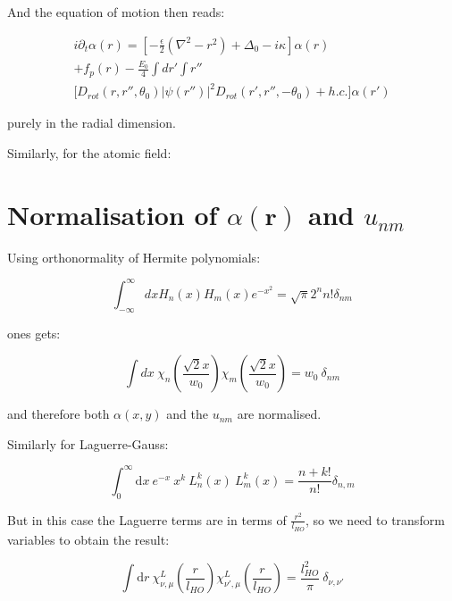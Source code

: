 \documentclass[a4paper,twocolumn,nobalancelastpage]{revtex4-1}
\newcommand{\vect}[1]{\mathbf{#1}}
\newcommand{\lho}{l_{HO}}
\newcommand{\chiaf}{\chi_{\nu,\mu}^L\left(\frac{r}{\lho}\right)}
\begin{document}
And the equation of motion then reads:

\begin{multline}
i \partial_t \alpha(r)= \left[ -\frac{\epsilon}{2} \left( \nabla^2 - r^2 \right) + \Delta_0 -i\kappa \right] \alpha(r)\\ + f_p(r)- \frac{E_0}{4}
 \int dr'\int r'' \\ \bigg[ D_{rot}(r,r'',\theta_0) |\psi(r'')|^2  D_{rot}(r',r'',-\theta_0)  + h.c.\bigg]\alpha(r')
\end{multline}

purely in the radial dimension.

Similarly, for the atomic field:




\appendix

\section{Normalisation of $\alpha(\vect{r})$ and $u_{nm}$}
\label{sec:normalisation-from-HG}

Using orthonormality of Hermite polynomials:

\begin{equation}
\int_{- \infty}^{\infty} dx H_n(x) H_m(x) e^{-x^2}=\sqrt{\pi} 2^n n! \delta_{nm}
\end{equation}

ones gets:

\begin{equation}
\int dx \ \chi_n \left(\frac{\sqrt{2}x}{w_0}\right) \chi_m \left(\frac{\sqrt{2}x}{w_0}\right) = w_0 \ \delta_{nm}
\end{equation}

and therefore both $\alpha(x,y)$ and the $u_{nm}$ are normalised.

Similarly for Laguerre-Gauss:

\begin{equation}
\label{eq:LGorthonorm}
\int_0^\infty \mathrm{d}x \ e^{-x} \ x^k \ L^k_n(x) \ L^k_m(x) = \frac{n+k!}{n!} \delta_{n,m}
\end{equation}

But in this case the Laguerre terms are in terms of $\frac{r^2}{\lho}$, so we need to transform variables to obtain the result:

\begin{equation}
\label{eq:Chiorthonorm}
\int \mathrm{d}r \ \chiaf \chi_{\nu',\mu}^L\left(\frac{r}{\lho}\right) = \frac{\lho^2}{\pi} \  \delta_{\nu,\nu'}
\end{equation}
\end{document}
